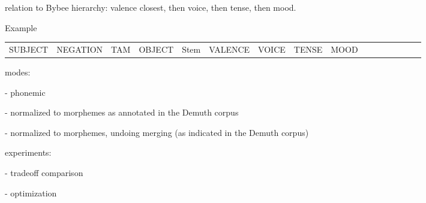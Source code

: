 relation to Bybee hierarchy: valence closest, then voice, then tense, then mood.

Example

\begin{tabular}{lllllllll|lllllll}
SUBJECT & NEGATION & TAM & OBJECT & Stem & VALENCE & VOICE & TENSE & MOOD \\
\end{tabular}



modes:

- phonemic

- normalized to morphemes as annotated in the Demuth corpus

- normalized to morphemes, undoing merging (as indicated in the Demuth corpus)

experiments:

- tradeoff comparison

- optimization






